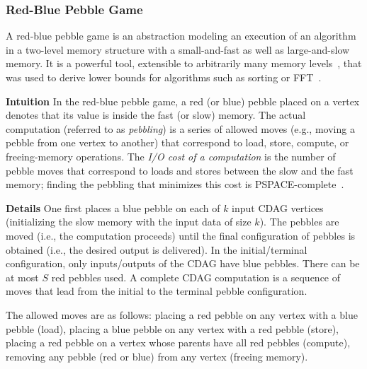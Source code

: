 \documentclass[sigplan,review,anonymous]{acmart}\settopmatter{printfolios=true,printccs=false,printacmref=false}
\newcommand\greg[1]{\textcolor{blue}{[Greg: #1]}}
\newtheorem{defn}{Definition}
\newcommand{\macb}[1]{\textbf{\textsf{#1}}}
\begin{document}
\subsubsection{Red-Blue Pebble Game}

A red-blue pebble game is an abstraction modeling an execution of an algorithm 
in a two-level memory structure with a 
small-and-fast
as well as large-and-slow memory.  It is a powerful tool, extensible to
arbitrarily many memory levels~\cite{redblueHierarchy}, that was used to derive
lower bounds for algorithms such as sorting or FFT~\cite{redblue}. 
%

\macb{Intuition}
%
In the red-blue pebble game, a red (or blue) pebble placed on a vertex denotes 
that its value is inside the fast (or slow) memory.
%
%
The actual computation (referred to as
\emph{pebbling}) is a series of allowed moves (e.g., moving a pebble from one
vertex to another) that correspond to load, store, compute, or
freeing-memory operations.
%
The \emph{I/O cost of a computation} is the number of pebble moves that
correspond to loads and stores between the slow and the fast memory; finding 
the pebbling that minimizes
this cost is PSPACE-complete~\cite{redbluecomplete, pebblegameregister}. 

\macb{Details}
%
One first places a blue pebble on each of $k$ input CDAG vertices (initializing 
the
slow memory with the input data of size $k$). The pebbles are moved (i.e., the
computation proceeds) until the final configuration of pebbles is obtained
(i.e., the desired output is delivered). 
%
%
%
In the initial/terminal configuration, only inputs/outputs of the CDAG have
blue pebbles.
%
There can be at most $S$ red pebbles used. A complete CDAG computation is a
sequence of moves that lead from the initial to the terminal pebble
configuration.


The allowed moves are as follows:  placing a red pebble on any vertex
with a blue pebble (load),  placing a blue pebble on any vertex with 
a red
pebble (store),  placing a red pebble on a vertex whose parents have 
all red
pebbles (compute),  removing any pebble (red or blue) from any vertex 
(freeing memory).
\end{document}
